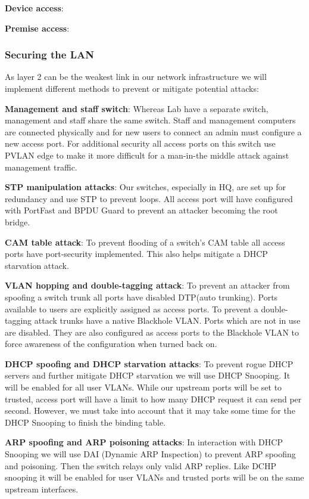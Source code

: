 
\textbf{Device access}:

\textbf{Premise access}:

\subsubsection{Securing the LAN}
As layer 2 can be the weakest link in our network infrastructure we will implement different methods to prevent or mitigate potential attacks:

\textbf{Management and staff switch}: Whereas Lab have a separate switch, management and staff share the same switch. Staff and management computers are connected physically and for new users to connect an admin must configure a new access port. For additional security all access ports on this switch use PVLAN edge to make it more difficult for a man-in-the middle attack against management traffic.

\textbf{STP manipulation attacks}: Our switches, especially in HQ, are set up for redundancy and use STP to prevent loops. All access port will have configured with PortFast and BPDU Guard to prevent an attacker becoming the root bridge.

\textbf{CAM table attack}: To prevent flooding of a switch's CAM table all access ports have port-security implemented. This also helps mitigate a DHCP starvation attack.

\textbf{VLAN hopping and double-tagging attack}: To prevent an attacker from spoofing a switch trunk all ports have disabled DTP(auto trunking). Ports available to users are explicitly assigned as access ports. To prevent a double-tagging attack trunks have a native Blackhole VLAN. Ports which are not in use are disabled. They are also configured as access ports to the Blackhole VLAN to force awareness of the configuration when turned back on.

\textbf{DHCP spoofing and DHCP starvation attacks}: To prevent rogue DHCP servers and further mitigate DHCP starvation we will use DHCP Snooping. It will be enabled for all user VLANs. While our upstream ports will be set to trusted, access port will have a limit to how many DHCP request it can send per second. However, we must take into account that it may take some time for the DHCP Snooping to finish the binding table. 

\textbf{ARP spoofing and ARP poisoning attacks}: In interaction with DHCP Snooping we will use DAI (Dynamic ARP Inspection) to prevent ARP spoofing and poisoning. Then the switch relays only valid ARP replies. Like DCHP snooping it will be enabled for user VLANs and trusted ports will be on the same upstream interfaces. 

